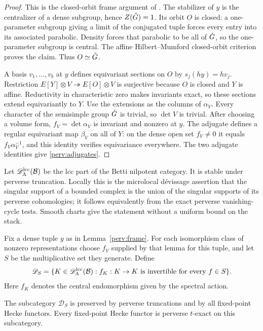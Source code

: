 \begin{proof}
This is the closed-orbit frame argument of \cite[Lemma~6.3]{CT}.
The stabilizer of $y$ is the centralizer of a dense subgroup, hence
$Z(\check G)=1$.  Its orbit $O$ is closed: a one-parameter subgroup giving
a limit of the conjugated tuple forces every entry into its associated
parabolic.  Density forces that parabolic to be all of $\check G$, so the
one-parameter subgroup is central.  The affine Hilbert--Mumford
closed-orbit criterion proves the claim.  Thus $O\simeq\check G$.

A basis $v_1,\ldots,v_b$ at $y$ defines equivariant sections on $O$ by
$s_j(hy)=hv_j$.  Restriction
$E[Y]\otimes V\twoheadrightarrow E[O]\otimes V$ is surjective because
$O$ is closed and $Y$ is affine.  Reductivity in characteristic zero
makes invariants exact, so these sections extend equivariantly to $Y$.
Use the extensions as the columns of $\alpha_V$.
Every character of the semisimple group $\check G$ is trivial, so
$\det V$ is trivial.  After choosing a volume form,
$f_V=\det\alpha_V$ is invariant and nonzero at $y$.
The adjugate defines a regular equivariant map $\beta_V$ on all of $Y$:
on the dense open set $f_V\ne0$ it equals $f_V\alpha_V^{-1}$, and
this identity verifies equivariance everywhere.  The two adjugate
identities give \eqref{perv:adjugates}.
\end{proof}

Let $\mathscr D^{\mathrm{lcc}}_\Lambda(\mathcal B)$ be the lcc part of the
Betti nilpotent category.  It is stable under perverse truncation.
Locally this is the microlocal d\'evissage assertion that the singular
support of a bounded complex is the union of the singular supports of
its perverse cohomologies; it follows equivalently from the exact
perverse vanishing-cycle tests.  Smooth charts give the statement
without a uniform bound on the stack.

Fix a dense tuple $y$ as in Lemma~\ref{perv:frame}.  For each
isomorphism class of nonzero representations choose $f_V$ supplied by
that lemma for this tuple, and let $S$ be the multiplicative set they
generate.  Define
\[
 \mathscr D_S=\{K\in\mathscr D^{\mathrm{lcc}}_\Lambda(\mathcal B):
             f_K:K\to K\text{ is invertible for every }f\in S\}.
\]
Here $f_K$ denotes the central endomorphism given by the spectral action.

\begin{lemma}\label{perv:exact}
The subcategory $\mathscr D_S$ is preserved by perverse truncations and
by all fixed-point Hecke functors.  Every fixed-point Hecke functor is
perverse $t$-exact on this subcategory.
\end{lemma}

